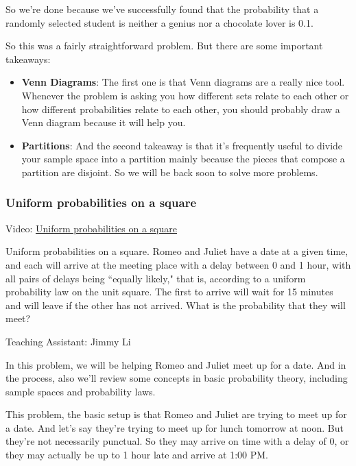 \documentclass[pdftex, brazil, 12pt, twoside]{article}
\begin{document}
So we're done because we've successfully found that the
probability that a randomly selected student is neither a
genius nor a chocolate lover is 0.1.

So this was a fairly straightforward problem.
But there are some important takeaways:

\begin{itemize}
\item \textbf{Venn Diagrams}: The first one is that Venn diagrams are
  a really nice tool. Whenever the problem is asking you how different sets relate
  to each other or how different probabilities relate to each
  other, you should probably draw a Venn diagram because it
  will help you.
\item \textbf{Partitions}: And the second takeaway is that it's frequently useful to
  divide your sample space into a partition mainly because the
  pieces that compose a partition are disjoint.
  So we will be back soon to solve more problems.
\end{itemize}

\subsubsection{Uniform probabilities on a square}
\label{un1-solved-uniform-prob}

Video: \href{https://www.youtube.com/watch?v=lVeROX4Mkv8}{Uniform probabilities on a square}

Uniform probabilities on a square. Romeo and Juliet have a date at a given time,
and each will arrive at the meeting place with a delay between 0 and 1 hour, with
all pairs of delays being “equally likely," that is, according to a uniform
probability law on the unit square. The first to arrive will wait for 15 minutes
and will leave if the other has not arrived. What is the probability that they
will meet?

Teaching Assistant: Jimmy Li

In this problem, we will be helping Romeo and Juliet meet
up for a date. And in the process, also we'll review some concepts in basic
probability theory, including sample spaces
and probability laws.

This problem, the basic setup is that Romeo and Juliet are
trying to meet up for a date.
And let's say they're trying to meet up for
lunch tomorrow at noon.
But they're not necessarily punctual.
So they may arrive on time with a delay of 0, or they may
actually be up to 1 hour late and arrive at 1:00 PM.
\end{document}
